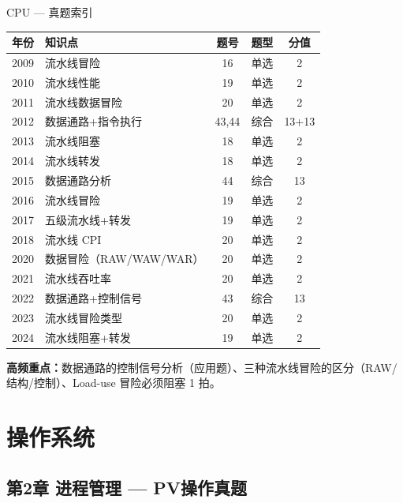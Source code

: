 \begin{tablebox}{CPU — 真题索引}
\centering
\begin{tabular}{|c|l|c|c|c|}
\hline
年份 & 知识点 & 题号 & 题型 & 分值 \\
\hline
2009 & 流水线冒险 & 16 & 单选 & 2 \\
2010 & 流水线性能 & 19 & 单选 & 2 \\
2011 & 流水线数据冒险 & 20 & 单选 & 2 \\
2012 & 数据通路+指令执行 & 43,44 & 综合 & 13+13 \\
2013 & 流水线阻塞 & 18 & 单选 & 2 \\
2014 & 流水线转发 & 18 & 单选 & 2 \\
2015 & 数据通路分析 & 44 & 综合 & 13 \\
2016 & 流水线冒险 & 19 & 单选 & 2 \\
2017 & 五级流水线+转发 & 19 & 单选 & 2 \\
2018 & 流水线 CPI & 20 & 单选 & 2 \\
2020 & 数据冒险（RAW/WAW/WAR）& 20 & 单选 & 2 \\
2021 & 流水线吞吐率 & 20 & 单选 & 2 \\
2022 & 数据通路+控制信号 & 43 & 综合 & 13 \\
2023 & 流水线冒险类型 & 20 & 单选 & 2 \\
2024 & 流水线阻塞+转发 & 19 & 单选 & 2 \\
\hline
\end{tabular}
\end{tablebox}

\noindent\textbf{高频重点：}数据通路的控制信号分析（应用题）、三种流水线冒险的区分（RAW/结构/控制）、Load-use 冒险必须阻塞 1 拍。

\section{操作系统}

\subsection*{第2章 进程管理 — PV操作真题}

